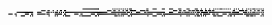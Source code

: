 \documentclass[10pt]{article}
\theoremstyle{plain}
\theoremstyle{definition}
\begin{document}
\begin{table*}[b]
{\begin{minipage}{5.32in}
\[\begin{array}{@{}r@{}}
\begin{array}{@{}l@{}}
\a\a\a\a\a\a\a\a\a\a\a\a\a\a\a\a\a\a\a\a\a\a\a\a\a\a\a\a\a\a\a\a\a\a\a\a \a\a\a\a\a\a\a\a\a\a\a\a\a\a\a\a\a\a\a\a\a\a\a\a\a\a\a\a\a\a\a\a\a\a\a\a \a\a\a\a\a\a\a\a\b\b\b\b\b\b\b\b\b\b\b\b\b\b\b\b\a\a\a\a\a\a\a\a\a\a\a\a \a\b\a\b\a\b\a\b\a\b\a\b\a\b\a\b\a\b\b\b\a\a\a\a\a\a\a\a\a\a\a\a\a\a\b\b \a\a\a\a\b\b\b\b\a\a\a\a\a\b\b\b\a\a\a\a\b\b\b\b\a\a\a\a\a\b\b\b\a\a\a\a \a\b\b\b\a\a\a\a\a\b\b\b\a\a\a\b\a\a\a\b\a\a\a\b\a\a\a\b\a\b\a\b\a\b\b\b \a\b\a\b\a\b\a\b\a\a\a\b\a\b\a\b\a\a\a\b\a\a\a\b\a\b\a\b\a\b\b\b\a\b\a\b \a\b\a\b\mynl
\a\a\a\a\a\a\a\a\a\a\a\a\a\a\a\a\a\a\a\a\a\a\a\a\a\a\a\a\a\a\a\a\a\a\a\a \a\a\a\a\b\b\b\b\a\a\b\b\a\a\a\b\a\a\a\b\a\a\b\b\a\a\b\b\a\a\a\a\a\a\a\a \a\a\a\a\a\a\a\a\a\a\a\a\a\a\a\a\a\a\a\a\a\a\a\a\a\a\a\a\a\a\a\a\b\b\b\b \a\a\b\b\a\a\a\b\a\a\a\b\a\a\b\b\a\a\b\b\b\b\b\b\a\a\a\a\b\b\b\b\b\a\b\b \a\a\a\a\a\a\a\a\a\a\a\a\a\a\a\a\a\a\a\a\a\a\a\a\b\b\b\b\a\a\b\b\a\a\b\b \a\a\a\b\b\a\b\b\b\a\b\b\b\a\b\b\b\a\a\b\b\a\b\b\b\a\b\b\a\a\a\a\a\a\a\a \a\a\a\a\a\a\a\a\a\a\b\b\a\a\a\a\b\b\b\b\b\a\b\b\a\a\a\b\a\a\a\b\a\a\b\b \a\a\b\b\mynl
\a\a\a\a\a\a\a\a\a\a\a\a\a\a\a\a\b\b\b\b\b\b\b\b\b\b\b\b\b\b\b\b\a\a\a\a \b\b\b\b\a\a\a\a\a\b\b\b\a\b\a\b\a\b\b\b\a\b\a\b\a\b\a\b\b\b\b\b\b\b\b\b \b\b\b\b\b\b\b\b\b\b\b\b\b\b\b\b\b\b\b\b\b\b\b\b\b\b\b\b\b\b\b\b\a\a\a\a \b\b\b\b\b\b\b\b\b\b\b\b\b\b\a\b\b\b\a\b\a\a\a\a\b\b\b\b\a\a\a\a\b\b\a\b \b\b\b\b\b\b\b\b\b\b\b\b\b\b\b\b\a\a\a\a\b\b\b\b\a\a\a\a\a\b\b\b\a\b\a\b \b\b\b\b\a\b\a\b\a\b\a\b\b\b\a\b\b\b\b\b\b\b\a\b\b\b\b\b\b\b\b\b\b\b\b\b \b\b\b\b\b\b\b\b\a\b\b\b\b\b\b\b\a\a\a\a\b\b\b\b\a\b\a\b\a\b\b\b\a\b\a\b \a\b\a\b\mynl
\a\a\a\a\a\a\a\a\b\b\b\b\a\a\b\b\a\a\a\a\a\a\a\a\b\b\b\b\a\a\b\b\a\a\a\a \b\b\b\b\b\b\b\b\a\b\b\b\a\a\a\a\a\b\b\b\b\b\b\b\a\a\b\b\a\a\a\a\a\a\a\a \b\b\b\b\a\a\b\b\a\a\a\a\a\a\a\a\b\b\b\b\a\a\b\b\b\b\b\b\b\b\b\b\b\b\b\b \b\b\b\b\b\a\b\b\a\b\b\b\b\b\b\b\a\a\b\b\b\b\b\b\b\b\b\b\b\b\b\b\b\b\b\b \b\b\b\b\a\a\a\a\b\b\b\b\b\a\b\b\b\b\b\b\b\b\b\b\b\b\b\b\b\b\b\b\b\b\b\b \b\b\b\b\b\b\b\b\b\a\b\b\b\a\b\b\a\b\b\b\b\b\b\b\a\a\b\b\b\a\b\b\a\a\a\a \b\b\b\b\a\a\b\b\b\b\b\b\b\b\b\b\b\b\b\b\a\b\b\b\b\b\b\b\b\b\b\b\b\b\b\b \a\a\b\b\mynl
\a\a\a\a\a\a\a\a\a\a\a\a\a\a\a\b\a\a\a\a\b\b\b\b\a\a\a\a\a\b\a\b\a\a\a\a \a\a\a\a\a\a\a\a\a\a\a\b\a\a\a\a\a\b\a\b\a\a\a\a\a\b\a\b\b\b\b\b\a\a\a\a \a\a\a\a\a\b\a\b\b\b\b\b\b\b\b\b\a\a\a\a\b\b\a\b\a\a\a\a\a\a\a\a\a\a\a\a \a\a\a\b\b\b\a\b\a\b\a\b\a\a\a\a\b\b\a\b\a\a\a\a\a\a\a\a\a\a\a\a\a\a\a\b \a\a\a\a\b\b\b\b\a\a\a\a\a\b\a\b\a\a\a\a\a\a\a\a\a\a\a\a\a\a\a\b\a\a\a\a \a\b\a\b\a\a\a\a\a\b\a\b\b\b\a\b\a\b\a\b\a\a\a\a\a\a\a\b\b\b\a\b\b\b\b\b \a\a\a\a\a\b\a\b\b\a\a\b\a\a\a\a\a\a\a\a\a\a\a\b\b\b\a\b\b\b\a\b\a\a\a\a \a\b\a\b\mynl

\end{array}
\end{array}\]
\end{minipage}}
\end{table*}
\end{document}
